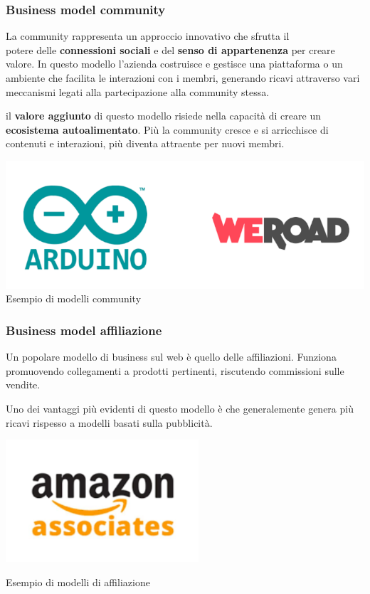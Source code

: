 \documentclass[14pt]{extarticle}
\begin{document}
\subsubsection{Business model community}

La community rappresenta un approccio innovativo che sfrutta il \\potere delle
\textbf{connessioni sociali} e del \textbf{senso di appartenenza} per creare
valore. In questo modello l'azienda costruisce e gestisce una piattaforma o un
ambiente che facilita le interazioni con i membri, generando ricavi attraverso
vari meccanismi legati alla partecipazione alla community stessa.

il \textbf{valore aggiunto} di questo modello risiede nella capacità di creare
un \textbf{ecosistema autoalimentato}. Più la community cresce e si arricchisce
di contenuti e interazioni, più diventa attraente per nuovi membri.

\begin{center}
    \includegraphics[scale=0.70]{images/community.png}
    Esempio di modelli community
\end{center}

\subsubsection{Business model affiliazione}

Un popolare modello di business sul web è quello delle affiliazioni. Funziona
promuovendo collegamenti a prodotti pertinenti, riscutendo commissioni sulle
vendite.

Uno dei vantaggi più evidenti di questo modello è che generalemente genera più
ricavi rispesso a modelli basati sulla pubblicità.

\begin{center}
    \includegraphics[scale=0.80]{images/affiliazioni.png}
   
    Esempio di modelli di affiliazione
\end{center}
\end{document}
